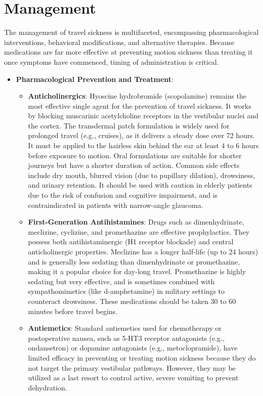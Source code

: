 \section*{Management}
The management of travel sickness is multifaceted, encompassing pharmacological interventions, behavioral modifications, and alternative therapies. Because medications are far more effective at preventing motion sickness than treating it once symptoms have commenced, timing of administration is critical.
\begin{itemize}
    \item \textbf{Pharmacological Prevention and Treatment}:
    \begin{itemize}
        \item \textbf{Anticholinergics}: Hyoscine hydrobromide (scopolamine) remains the most effective single agent for the prevention of travel sickness. It works by blocking muscarinic acetylcholine receptors in the vestibular nuclei and the cortex. The transdermal patch formulation is widely used for prolonged travel (e.g., cruises), as it delivers a steady dose over 72 hours. It must be applied to the hairless skin behind the ear at least 4 to 6 hours before exposure to motion. Oral formulations are suitable for shorter journeys but have a shorter duration of action. Common side effects include dry mouth, blurred vision (due to pupillary dilation), drowsiness, and urinary retention. It should be used with caution in elderly patients due to the risk of confusion and cognitive impairment, and is contraindicated in patients with narrow-angle glaucoma.
        \item \textbf{First-Generation Antihistamines}: Drugs such as dimenhydrinate, meclizine, cyclizine, and promethazine are effective prophylactics. They possess both antihistaminergic (H1 receptor blockade) and central anticholinergic properties. Meclizine has a longer half-life (up to 24 hours) and is generally less sedating than dimenhydrinate or promethazine, making it a popular choice for day-long travel. Promethazine is highly sedating but very effective, and is sometimes combined with sympathomimetics (like d-amphetamine) in military settings to counteract drowsiness. These medications should be taken 30 to 60 minutes before travel begins.
        \item \textbf{Antiemetics}: Standard antiemetics used for chemotherapy or postoperative nausea, such as 5-HT3 receptor antagonists (e.g., ondansetron) or dopamine antagonists (e.g., metoclopramide), have limited efficacy in preventing or treating motion sickness because they do not target the primary vestibular pathways. However, they may be utilized as a last resort to control active, severe vomiting to prevent dehydration.

\end{itemize}
\end{itemize}
